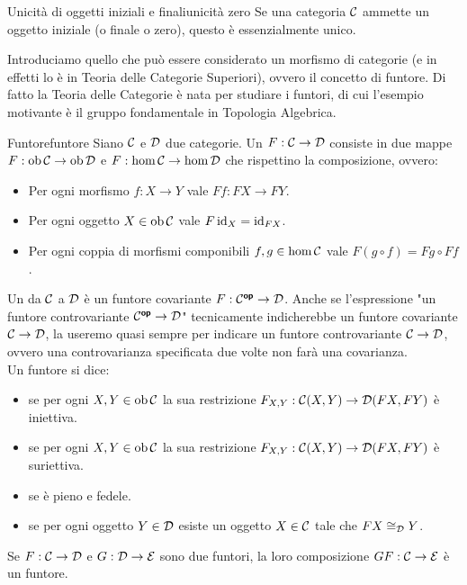\documentclass{article}
\renewcommand\C{\mc{C}}
\newcommand\D{\mc{D}}
\begin{document}
\begin{proposition}{Unicità di oggetti iniziali e finali}{unicità zero}
    Se una categoria $\C$ ammette un oggetto iniziale (o finale o zero), questo è essenzialmente unico.
\end{proposition}

Introduciamo quello che può essere considerato un morfismo di categorie (e in effetti lo è in Teoria delle Categorie Superiori), ovvero il concetto di funtore. Di fatto la Teoria delle Categorie è nata per studiare i funtori, di cui l'esempio motivante è il gruppo fondamentale in Topologia Algebrica.

\begin{definition}{Funtore}{funtore}
    Siano $\C$ e $\D$ due categorie. Un  $F: \C\to\D$ consiste in due mappe $F:\ob\C\to\ob\D$ e $F:\hom\C\to\hom\D$ che rispettino la composizione, ovvero:\begin{itemize}
        \item Per ogni morfismo $f :X\to Y$ vale $Ff: FX \to FY$.
        \item Per ogni oggetto $X \in \ob\C$ vale $F\operatorname{id}_X = \operatorname{id}_{FX}$.
        \item Per ogni coppia di morfismi componibili $f,g \in \hom\C$ vale $F(g\circ f) = Fg\circ Ff$.
    \end{itemize}
    Un  da $\C$ a $\D$ è un funtore covariante $F: \C^\op\to\D$. Anche se l'espressione "un funtore controvariante $\C^\op\to\D$" tecnicamente indicherebbe un funtore covariante $\C\to\D$, la useremo quasi sempre per indicare un funtore controvariante $\C\to\D$, ovvero una controvarianza specificata due volte non farà una covarianza.\\
    Un funtore si dice:\begin{itemize}
        \item {} se per ogni $X,Y \in \ob\C$ la sua restrizione $F_{X,Y}:\C(X,Y)\to \D(FX,FY)$ è iniettiva.
        \item {} se per ogni $X,Y \in \ob\C$ la sua restrizione $F_{X,Y}:\C(X,Y)\to \D(FX,FY)$ è suriettiva.
        \item {} se è pieno e fedele.
        \item {} se per ogni oggetto $Y \in \D$ esiste un oggetto $X \in \C$ tale che $FX\cong_\D Y$.
    \end{itemize}
    Se $F:\C\to\D$ e $G:\D\to\mc{E}$ sono due funtori, la loro composizione $GF : \C\to\mc{E}$ è un funtore.
\end{definition}
\end{document}
